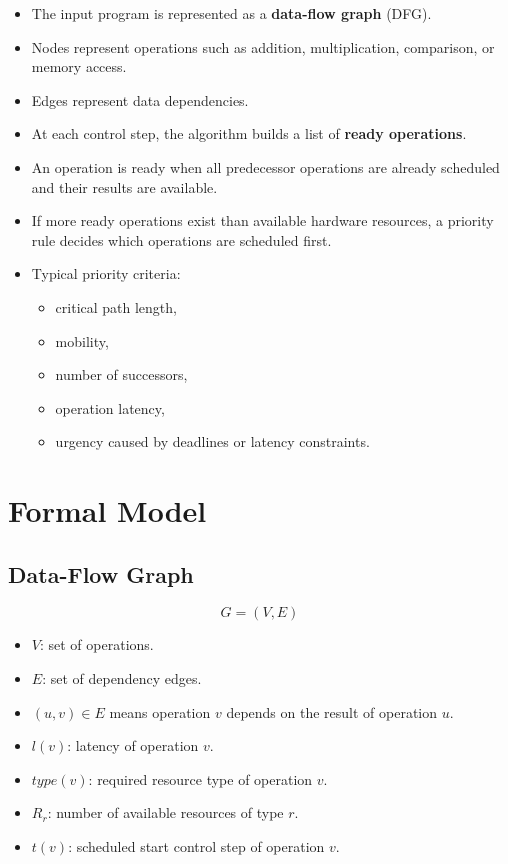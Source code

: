 \documentclass[11pt,a4paper]{article}
\begin{document}
\begin{itemize}[leftmargin=*]
    \item The input program is represented as a \textbf{data-flow graph} (DFG).
    \item Nodes represent operations such as addition, multiplication, comparison, or memory access.
    \item Edges represent data dependencies.
    \item At each control step, the algorithm builds a list of \textbf{ready operations}.
    \item An operation is ready when all predecessor operations are already scheduled and their results are available.
    \item If more ready operations exist than available hardware resources, a priority rule decides which operations are scheduled first.
    \item Typical priority criteria:
    \begin{itemize}
        \item critical path length,
        \item mobility,
        \item number of successors,
        \item operation latency,
        \item urgency caused by deadlines or latency constraints.
    \end{itemize}
\end{itemize}

\section{Formal Model}

\subsection*{Data-Flow Graph}

\[
G = (V,E)
\]

\begin{itemize}[leftmargin=*]
    \item $V$: set of operations.
    \item $E$: set of dependency edges.
    \item $(u,v) \in E$ means operation $v$ depends on the result of operation $u$.
    \item $l(v)$: latency of operation $v$.
    \item $type(v)$: required resource type of operation $v$.
    \item $R_r$: number of available resources of type $r$.
    \item $t(v)$: scheduled start control step of operation $v$.
\end{itemize}
\end{document}
